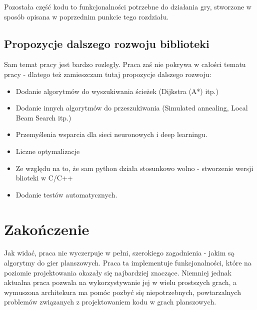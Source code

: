 \documentclass[declaration,shortabstract,inz]{iithesis}
\begin{document}
Pozostała część kodu to funkcjonalności potrzebne do działania gry, stworzone w sposób opisana w poprzednim punkcie tego rozdziału.

\section{Propozycje dalszego rozwoju biblioteki}
Sam temat pracy jest bardzo rozległy.
Praca zaś nie pokrywa w całości tematu pracy - dlatego też zamieszczam tutaj propozycje dalszego rozwoju:
\begin{itemize}
  \item Dodanie algorytmów do wyszukiwania ścieżek (Dijkstra (A*) itp.)
  \item Dodanie innych algorytmów do przeszukiwania (Simulated annealing, Local Beam Search itp.)
  \item Przemyślenia wsparcia dla sieci neuronowych i deep learningu.
  \item Liczne optymalizacje
  \item Ze względu na to, że sam python działa stosunkowo wolno - stworzenie wersji blioteki w C/C++
  \item Dodanie testów automatycznych.
\end{itemize}

\chapter{Zakończenie}

Jak widać, praca nie wyczerpuje w pełni, szerokiego zagadnienia - jakim są algorytmy do gier planszowych.
Praca ta implementuje funkcjonalności, które na poziomie projektowania okazały się najbardziej znaczące.
Niemniej jednak aktualna praca pozwala na wykorzystywanie jej w wielu prostszych grach, a wymuszona architekura ma pomóc pozbyć się niepotrzebnych, powtarzalnych problemów związanych z projektowaniem kodu w grach planszowych.


\end{document}
